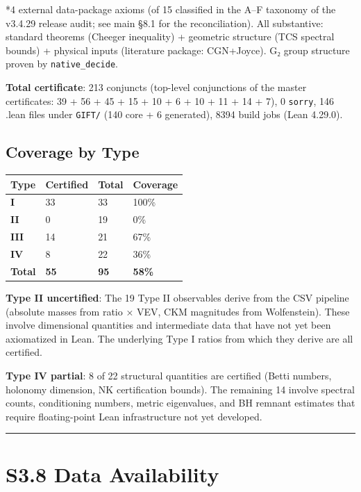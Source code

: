 \documentclass[11pt,a4paper]{article}
\begin{document}
*4 external data-package axioms (of 15 classified in the A--F taxonomy of the v3.4.29 release audit; see main §8.1 for the reconciliation). All substantive: standard theorems (Cheeger inequality) + geometric structure (TCS spectral bounds) + physical inputs (literature package: CGN+Joyce). G₂ group structure proven by \texttt{native\_\allowbreak{}decide}.

\textbf{Total certificate}: 213 conjuncts (top-level conjunctions of the master certificates: 39 + 56 + 45 + 15 + 10 + 6 + 10 + 11 + 14 + 7), 0 \texttt{sorry}, 146 .lean files under \texttt{GIFT/\allowbreak{}} (140 core + 6 generated), 8394 build jobs (Lean 4.29.0).

\subsection{Coverage by Type}\label{coverage-by-type}

\begin{longtable}[]{@{}llll@{}}
\toprule\noalign{}
Type & Certified & Total & Coverage \\
\midrule\noalign{}
\endhead
\bottomrule\noalign{}
\endlastfoot
\textbf{I} & 33 & 33 & 100\% \\
\textbf{II} & 0 & 19 & 0\% \\
\textbf{III} & 14 & 21 & 67\% \\
\textbf{IV} & 8 & 22 & 36\% \\
\textbf{Total} & \textbf{55} & \textbf{95} & \textbf{58\%} \\
\end{longtable}

\textbf{Type II uncertified}: The 19 Type II observables derive from the CSV pipeline (absolute masses from ratio × VEV, CKM magnitudes from Wolfenstein). These involve dimensional quantities and intermediate data that have not yet been axiomatized in Lean. The underlying Type I ratios from which they derive are all certified.

\textbf{Type IV partial}: 8 of 22 structural quantities are certified (Betti numbers, holonomy dimension, NK certification bounds). The remaining 14 involve spectral counts, conditioning numbers, metric eigenvalues, and BH remnant estimates that require floating-point Lean infrastructure not yet developed.

\begin{center}\rule{\linewidth}{0.5pt}\end{center}

\section{S3.8 Data Availability}\label{s3.8-data-availability}
\end{document}
